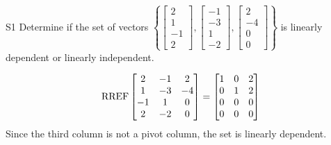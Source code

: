 \begin{problem}{S1}
Determine if the set of vectors \(\left\{ \begin{bmatrix} 2 \\ 1 \\ -1 \\ 2 \end{bmatrix}, \begin{bmatrix} -1 \\ -3 \\ 1 \\ -2 \end{bmatrix}, \begin{bmatrix} 2 \\ -4 \\ 0 \\ 0 \end{bmatrix} \right\} \) is linearly dependent or linearly independent.
\end{problem}
\begin{solution}
\[ \operatorname{RREF} \begin{bmatrix} 2 & -1 & 2 \\ 1 & -3 & -4 \\ -1 & 1 & 0 \\ 2 & -2 & 0 \end{bmatrix} = \begin{bmatrix} 1 & 0 & 2 \\ 0 & 1 & 2 \\ 0 & 0 & 0 \\ 0 & 0 & 0 \end{bmatrix} \]
Since the third column is not a pivot column, the set is linearly dependent.
\end{solution}

